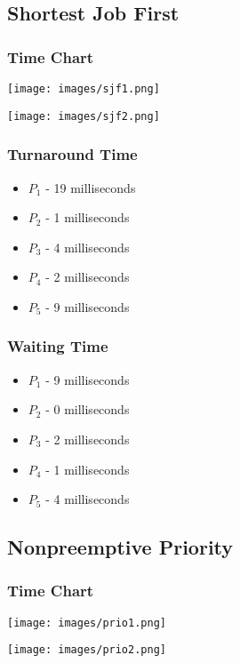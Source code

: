 \documentclass[letterpaper, 10pt,DIV=13]{scrartcl}
\numberwithin{equation}{section} %
\numberwithin{figure}{section} %
\numberwithin{table}{section} %
\begin{document}
\subsection{Shortest Job First}
\subsubsection{Time Chart}

\begin{center}\texttt{[image: images/sjf1.png]}\end{center}
\begin{center}\texttt{[image: images/sjf2.png]}\end{center}

\subsubsection{Turnaround Time}
\begin{itemize}
    \item $P_1$ - 19 milliseconds
    \item $P_2$ - 1 milliseconds
    \item $P_3$ - 4 milliseconds
    \item $P_4$ - 2 milliseconds
    \item $P_5$ - 9 milliseconds
\end{itemize}

\subsubsection{Waiting Time}
\begin{itemize}
    \item $P_1$ - 9 milliseconds
    \item $P_2$ - 0 milliseconds
    \item $P_3$ - 2 milliseconds
    \item $P_4$ - 1 milliseconds
    \item $P_5$ - 4 milliseconds
\end{itemize}

\subsection{Nonpreemptive Priority}
\subsubsection{Time Chart}

\begin{center}\texttt{[image: images/prio1.png]}\end{center}
\begin{center}\texttt{[image: images/prio2.png]}\end{center}
\end{document}
